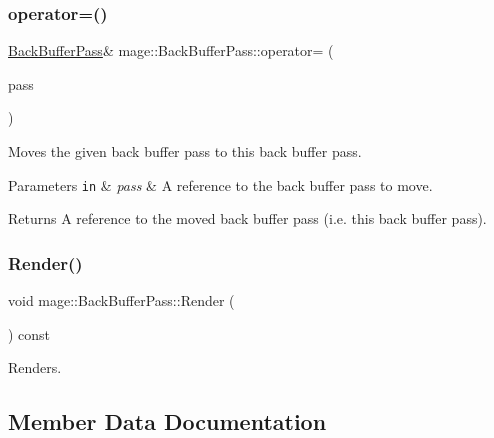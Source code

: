 \subsubsection{\texorpdfstring{operator=()}{operator=()}\hspace{0.1cm}{\footnotesize\ttfamily [2/2]}}
{\footnotesize\ttfamily \hyperlink{classmage_1_1_back_buffer_pass}{Back\+Buffer\+Pass}\& mage\+::\+Back\+Buffer\+Pass\+::operator= (\begin{DoxyParamCaption}\item[{\hyperlink{classmage_1_1_back_buffer_pass}{Back\+Buffer\+Pass} \&\&}]{pass }\end{DoxyParamCaption})\hspace{0.3cm}{\ttfamily [delete]}}

Moves the given back buffer pass to this back buffer pass.


\begin{DoxyParams}[1]{Parameters}
\mbox{\tt in}  & {\em pass} & A reference to the back buffer pass to move. \\
\hline
\end{DoxyParams}
\begin{DoxyReturn}{Returns}
A reference to the moved back buffer pass (i.\+e. this back buffer pass). 
\end{DoxyReturn}
\hypertarget{classmage_1_1_back_buffer_pass_a6f0265c182a4b1ac2badd5df3fb11545}{}\label{classmage_1_1_back_buffer_pass_a6f0265c182a4b1ac2badd5df3fb11545} 
\subsubsection{\texorpdfstring{Render()}{Render()}}
{\footnotesize\ttfamily void mage\+::\+Back\+Buffer\+Pass\+::\+Render (\begin{DoxyParamCaption}{ }\end{DoxyParamCaption}) const\hspace{0.3cm}{\ttfamily [noexcept]}}

Renders. 

\subsection{Member Data Documentation}
\hypertarget{classmage_1_1_back_buffer_pass_a08d816be20d35edae0b8fc7975bde76d}{}\label{classmage_1_1_back_buffer_pass_a08d816be20d35edae0b8fc7975bde76d} 
